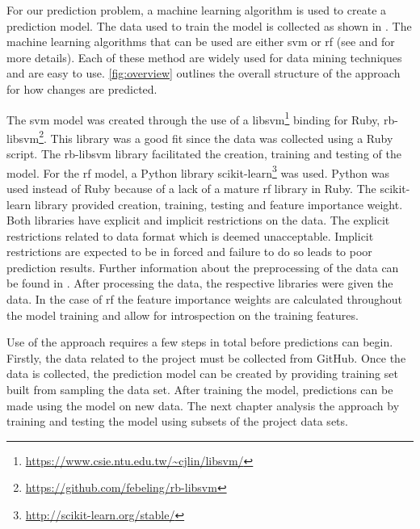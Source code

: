 
For our prediction problem, a machine learning algorithm is used to create a prediction model. The data used to train the model is collected as shown in . The machine learning algorithms that can be used are either \gls{svm} or \gls{rf} (see  and  for more details). Each of these method are widely used for data mining techniques and are easy to use. \autoref{fig:overview} outlines the overall structure of the approach for how changes are predicted.


The \gls{svm} model was created through the use of a libsvm\footnote{\url{https://www.csie.ntu.edu.tw/~cjlin/libsvm/}} binding for Ruby, rb-libsvm\footnote{\url{https://github.com/febeling/rb-libsvm}}. This library was a good fit since the data was collected using a Ruby script. The rb-libsvm library facilitated the creation, training and testing of the model. For the \gls{rf} model, a Python library scikit-learn\footnote{\url{http://scikit-learn.org/stable/}} was used. Python was used instead of Ruby because of a lack of a mature \gls{rf} library in Ruby. The scikit-learn library provided creation, training, testing and feature importance weight. Both libraries have explicit and implicit restrictions on the data. The explicit restrictions related to data format which is deemed unacceptable. Implicit restrictions are expected to be in forced and failure to do so leads to poor prediction results. Further information about the preprocessing of the data can be found in . After processing the data, the respective libraries were given the data. In the case of \gls{rf} the feature importance weights are calculated throughout the model training and allow for introspection on the training features.

Use of the approach requires a few steps in total before predictions can begin. Firstly, the data related to the project must be collected from GitHub. Once the data is collected, the prediction model can be created by providing training set built from sampling the data set. After training the model, predictions can be made using the model on new data. The next chapter analysis the approach by training and testing the model using subsets of the project data sets.